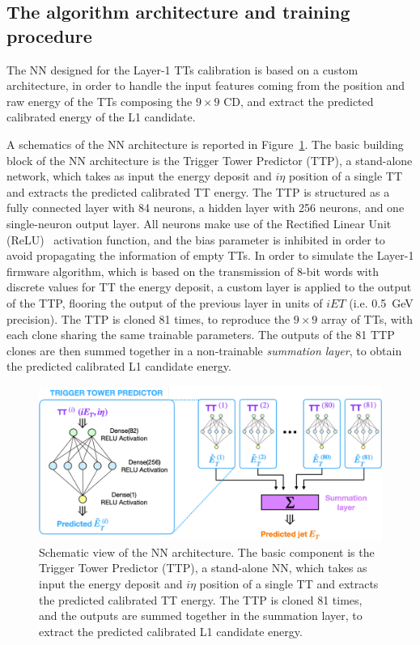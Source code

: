 \subsection{The algorithm architecture and training procedure} 

The NN designed for the Layer-1 TTs calibration is based on a custom architecture, in order to handle the input features coming from the position and raw energy of the TTs composing the $9\times9$ CD, and extract the predicted calibrated energy of the L1 candidate.

A schematics of the NN architecture is reported in Figure~\ref{fig:TTP}.
The basic building block of the NN architecture is the Trigger Tower Predictor (TTP), a stand-alone network, which takes as input the energy deposit and $i\eta$ position of a single TT and extracts the predicted calibrated TT energy.
The TTP is structured as a fully connected layer with 84 neurons, a hidden layer with 256 neurons, and one single-neuron output layer. All neurons make use of the Rectified Linear Unit (ReLU)~\cite{4082265} activation function, and the bias parameter is inhibited in order to avoid propagating the information of empty TTs.
In order to simulate the Layer-1 firmware algorithm, which is based on the transmission of 8-bit words with discrete values for TT the energy deposit, a custom layer is applied to the output of the TTP, flooring the output of the previous layer in units of $iET$ (i.e. 0.5~GeV precision).
The TTP is cloned 81 times, to reproduce the $9\times9$ array of TTs, with each clone sharing the same trainable parameters.
The outputs of the 81 TTP clones are then summed together in a non-trainable \textit{summation layer}, to obtain the predicted calibrated L1 candidate energy.

\bigbreak

\begin{figure}
    \centering
    \includegraphics[width=0.8\linewidth]{Figures/L1TP/TTP.pdf}
    \caption{Schematic view of the NN architecture. The basic component is the Trigger Tower Predictor (TTP), a stand-alone NN, which takes as input the energy deposit and $i\eta$ position of a single TT and extracts the predicted calibrated TT energy. The TTP is cloned 81 times, and the outputs are summed together in the summation layer, to extract the predicted calibrated L1 candidate energy.}
    \label{fig:TTP}
\end{figure}

